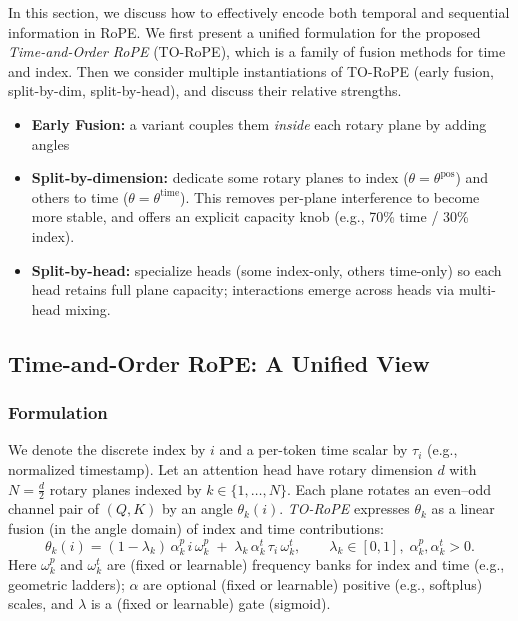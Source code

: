 \documentclass[sigconf]{acmart}
\begin{document}
In this section, we discuss how to effectively encode both temporal and sequential information in RoPE. We first present a unified formulation for the proposed \emph{Time-and-Order RoPE} (TO-RoPE), which is a family of fusion methods for time and index. Then we consider multiple instantiations of TO-RoPE (early fusion, split-by-dim, split-by-head), and discuss their relative strengths.
\begin{itemize}
\item \textbf{Early Fusion:} a variant couples them \emph{inside} each rotary plane by adding angles
\item \textbf{Split-by-dimension:} dedicate some rotary planes to index ($\theta{=}\theta^{\mathrm{pos}}$) and others to time ($\theta{=}\theta^{\mathrm{time}}$). This removes per-plane interference to become more stable, and offers an explicit capacity knob (e.g., 70\% time / 30\% index).
\item \textbf{Split-by-head:} specialize heads (some index-only, others time-only) so each head retains full plane capacity; interactions emerge across heads via multi-head mixing.
\end{itemize}

\subsection{Time-and-Order RoPE: A Unified View}
\subsubsection{Formulation}
We denote the discrete index by $i$ and a per-token time scalar by $\tau_i$ (e.g., normalized timestamp). Let an attention head have rotary dimension $d$ with $N=\tfrac{d}{2}$ rotary planes indexed by $k\in\{1,\ldots,N\}$. Each plane rotates an even–odd channel pair of $(Q,K)$ by an angle $\theta_{k}(i)$. \emph{TO-RoPE} expresses $\theta_k$ as a linear fusion (in the angle domain) of index and time contributions:
\begin{equation}
\label{eq:to-rope}
\theta_{k}(i)
=
(1-\lambda_{k})\,\alpha^{p}_{k}\, i\,\omega^{p}_{k}
\;+\;
\lambda_{k}\,\alpha^{t}_{k}\, \tau_i\,\omega^{t}_{k},
\qquad
\lambda_{k}\in[0,1],\;\alpha^{p}_{k},\alpha^{t}_{k}>0.
\end{equation}
Here $\omega^{p}_{k}$ and $\omega^{t}_{k}$ are (fixed or learnable) frequency banks for index and time (e.g., geometric ladders); $\alpha$ are optional (fixed or learnable) positive (e.g., softplus) scales, and $\lambda$ is a (fixed or learnable) gate (sigmoid).
\end{document}
